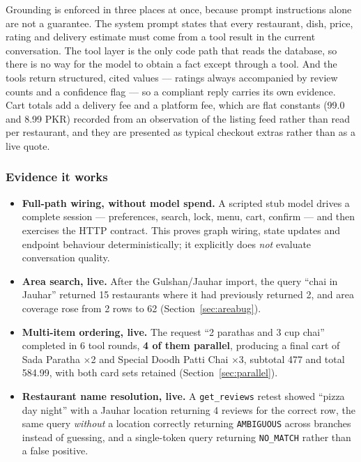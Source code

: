 \documentclass[11pt,a4paper]{article}
\newcommand{\code}[1]{\texttt{\small #1}}
\begin{document}
Grounding is enforced in three places at once, because prompt instructions
alone are not a guarantee. The system prompt states that every restaurant,
dish, price, rating and delivery estimate must come from a tool result in the
current conversation. The tool layer is the only code path that reads the
database, so there is no way for the model to obtain a fact except through a
tool. And the tools return structured, cited values --- ratings always
accompanied by review counts and a confidence flag --- so a compliant reply
carries its own evidence. Cart totals add a delivery fee and a platform fee,
which are flat constants (99.0 and 8.99 PKR) recorded from an observation of
the listing feed rather than read per restaurant, and they are presented as
typical checkout extras rather than as a live quote.

\subsubsection*{Evidence it works}

\begin{itemize}[itemsep=3pt,topsep=4pt]
\item \textbf{Full-path wiring, without model spend.} A scripted stub model
      drives a complete session --- preferences, search, lock, menu, cart,
      confirm --- and then exercises the HTTP contract. This proves graph
      wiring, state updates and endpoint behaviour deterministically; it
      explicitly does \emph{not} evaluate conversation quality.
\item \textbf{Area search, live.} After the Gulshan/Jauhar import, the query
      ``chai in Jauhar'' returned 15 restaurants where it had previously
      returned 2, and area coverage rose from 2 rows to 62
      (Section~\ref{sec:areabug}).
\item \textbf{Multi-item ordering, live.} The request ``2 parathas and 3 cup
      chai'' completed in 6 tool rounds, \textbf{4 of them parallel},
      producing a final cart of Sada Paratha $\times$2 and Special Doodh Patti
      Chai $\times$3, subtotal 477 and total 584.99, with both card sets
      retained (Section~\ref{sec:parallel}).
\item \textbf{Restaurant name resolution, live.} A \code{get\_reviews} retest
      showed ``pizza day night'' with a Jauhar location returning 4 reviews for
      the correct row, the same query \emph{without} a location correctly
      returning \code{AMBIGUOUS} across branches instead of guessing, and a
      single-token query returning \code{NO\_MATCH} rather than a false
      positive.
\end{itemize}
\end{document}
